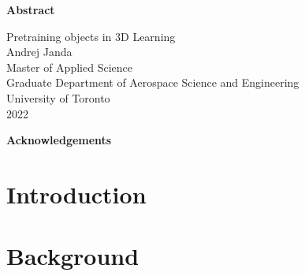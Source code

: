 \documentclass[12pt]{book}
\begin{document}
\begin{spacing}{1.25}
    \thispagestyle{plain}

    \begin{center}
        \Large
        \textbf{Abstract}
    \end{center}

    \begin{center}
        Pretraining objects in 3D Learning \\
        Andrej Janda \\
        Master of Applied Science \\
        Graduate Department of Aerospace Science and Engineering \\
        University of Toronto \\
        2022
    \end{center}

    \lipsum[1]

    \newpage

    \thispagestyle{plain}
    \begin{center}
        \Large
        \textbf{Acknowledgements}
    \end{center}

    \lipsum[1-3]


    \tableofcontents
    \thispagestyle{plain}
    \newpage

    \chapter{Introduction}

    \lipsum[2-10]


    \chapter{Background}

    \lipsum[2-10]
\end{spacing}


\newpage


\end{document}

